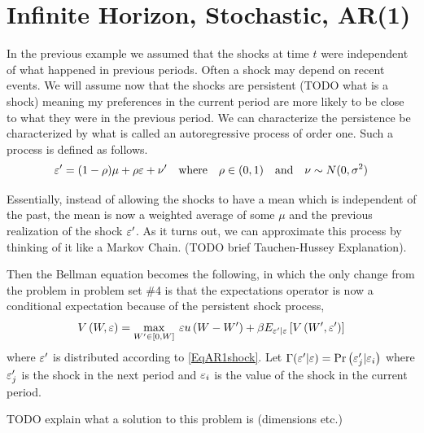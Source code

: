 \newpage
\section{Infinite Horizon, Stochastic, AR(1)}\label{SecRecProbInfinHorStochAR1}

In the previous example we assumed that the shocks at time $t$ were independent of what happened in previous periods.  Often a shock may depend on recent events.  We will assume now that the shocks are persistent (TODO what is a shock) meaning my preferences in the current period are more likely to be close to what they were in the previous period.  We can characterize the persistence be characterized by what is called an autoregressive process of order one.  Such a process is defined as follows.
\begin{equation}\label{EqAR1shock}
   \varepsilon' = (1-\rho)\mu + \rho\varepsilon + \nu' \quad\text{where}\quad \rho\in(0,1) \quad\text{and}\quad \nu\sim N(0,\sigma^2)
\end{equation}

Essentially, instead of allowing the shocks to have a mean which is independent of the past, the mean is now a weighted average of some $\mu$ and the previous realization of the shock $\varepsilon'$.  As it turns out, we can approximate this process by thinking of it like a Markov Chain. (TODO brief Tauchen-Hussey Explanation).

Then the Bellman equation becomes the following, in which the only change from the problem in problem set \#4 is that the expectations operator is now a conditional expectation because of the persistent shock process,
\begin{equation*}
   V\left(W,\varepsilon\right) = \max_{W'\in[0,W]}\: \varepsilon u\left(W - W'\right) + \beta E_{\varepsilon'|\varepsilon}\left[V\left(W',\varepsilon'\right)\right]
\end{equation*}
where $\varepsilon'$ is distributed according to \eqref{EqAR1shock}. Let $\Gamma(\varepsilon'|\varepsilon)=\text{Pr}\left(\varepsilon_j'|\varepsilon_i\right)$ where $\varepsilon_j'$ is the shock in the next period and $\varepsilon_i$ is the value of the shock in the current period.

TODO explain what a solution to this problem is (dimensions etc.)
\vspace{5mm}

